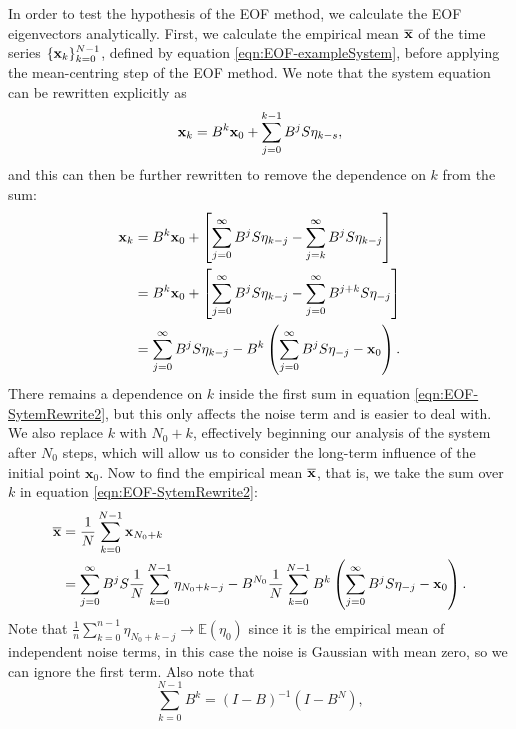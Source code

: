 In order to test the hypothesis of the EOF method, we calculate the EOF eigenvectors analytically. First, we calculate the empirical mean $\overline{\mathbf{x}}$ of the time series $\{\mathbf{x}_k\}_{k=0}^{N-1}$, defined by equation \ref{eqn:EOF-exampleSystem}, before applying the mean-centring step of the EOF method. We note that the system equation can be rewritten explicitly as
\begin{equation}
\mathbf{x}_k = B^k\mathbf{x}_0 + \sum_{j=0}^{k-1} B^{j} S \mathbf{\eta}_{k-s},
\label{eqn:EOF-SytemRewrite1}
\end{equation}
and this can then be further rewritten to remove the dependence on $k$ from the sum:
\begin{align}
	\begin{split}
\mathbf{x}_k &= B^k\mathbf{x}_0 + \left[ \sum_{j=0}^{\infty} B^{j} S \mathbf{\eta}_{k-j} - \sum_{j=k}^{\infty} B^{j} S \mathbf{\eta}_{k-j}\right]\\
&= B^k\mathbf{x}_0 + \left[ \sum_{j=0}^{\infty} B^{j} S \mathbf{\eta}_{k-j} - \sum_{j=0}^{\infty} B^{j+k} S \mathbf{\eta}_{-j}\right]\\
&= \sum_{j=0}^{\infty} B^{j} S \mathbf{\eta}_{k-j} - B^k \left(\sum_{j=0}^{\infty} B^{j} S \mathbf{\eta}_{-j} - \mathbf{x}_0\right).
\label{eqn:EOF-SytemRewrite2}
\end{split}
\end{align}
There remains a dependence on $k$ inside the first sum in equation \ref{eqn:EOF-SytemRewrite2}, but this only affects the noise term and is easier to deal with. We also replace $k$ with $N_0+k$, effectively beginning our analysis of the system after $N_0$ steps, which will allow us to consider the long-term influence of the initial point $\mathbf{x}_0$. Now to find the empirical mean $\overline{\mathbf{x}}$, that is, we take the sum over $k$ in equation \ref{eqn:EOF-SytemRewrite2}:
\begin{align}
\begin{split}
	\overline{\mathbf{x}} &= \frac{1}{N}\sum_{k=0}^{N-1} \mathbf{x}_{N_0+k}\\
	&= \sum_{j=0}^{\infty} B^j S \frac{1}{N}\sum_{k=0}^{N-1}\eta_{N_0+k-j} - B^{N_0} \frac{1}{N}\sum_{k=0}^{N-1} B^k \left(\sum_{j=0}^{\infty} B^{j} S \mathbf{\eta}_{-j} - \mathbf{x}_0\right).
\end{split}
\end{align}
Note that $\frac{1}{n}\sum_{k=0}^{n-1}\eta_{N_0+k-j} \rightarrow \mathbb{E}(\eta_0)$ since it is the empirical mean of independent noise terms, in this case the noise is Gaussian with mean zero, so we can ignore the first term. Also note that 
\begin{equation}
\sum_{k=0}^{N-1} B^k = (I-B)^{-1}(I-B^N),
\end{equation}
